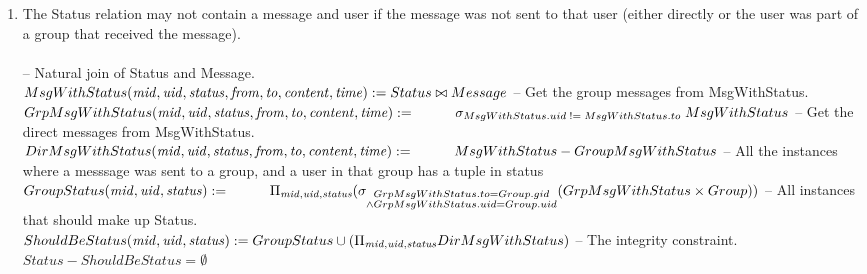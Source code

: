 \documentclass{article}
\newcommand{\var}[1]{\mathit{#1}}
\begin{document}
\begin{enumerate}
 
\item
The Status relation may not contain a message and user if the message was not sent to that user (either directly or the user was part of a group that received the message). \\\\ [5pt]
{\large
\hspace*{1cm} -- Natural join of Status and Message.\\ [5pt]
$
MsgWithStatus(\var{mid}, \var{uid}, \var{status}, \var{from}, \var{to}, \var{content}, \var{time}) := 
	Status \bowtie Message \\\\ [5pt]
$ 
\hspace*{1cm} -- Get the group messages from MsgWithStatus. \\ [5pt]
$
GrpMsgWithStatus(\var{mid}, \var{uid}, \var{status}, \var{from}, \var{to}, \var{content}, \var{time}) := \\ [5pt]
\hspace*{1cm}
	\sigma_{MsgWithStatus.uid \; != \; MsgWithStatus.to} \; MsgWithStatus \\\\ [5pt]
$
\hspace*{1cm} -- Get the direct messages from MsgWithStatus. \\ [5pt]
$
DirMsgWithStatus(\var{mid}, \var{uid}, \var{status}, \var{from}, \var{to}, \var{content}, \var{time}) := \\ [5pt]
\hspace*{1cm}
	MsgWithStatus - GroupMsgWithStatus \\\\ [5pt]
$
\hspace*{1cm} -- All the instances where a messsage was sent to a group, and a user in that \hspace*{1cm}group has a tuple in status \\ [5pt]
$
GroupStatus(\var{mid}, \var{uid}, \var{status}) := \\ [5pt]
	\hspace*{1cm}\Pi_{\var{mid}, \var{uid}, \var{status}}
	(\sigma_{\substack{GrpMsgWithStatus.to = Group.gid \\
			\wedge GrpMsgWithStatus.uid = Group.uid}}
			(GrpMsgWithStatus \times Group)) \\\\\\ [5pt]
$
\hspace*{1cm} -- All instances that should make up Status. \\ [5pt]
$
ShouldBeStatus(\var{mid}, \var{uid}, \var{status}) :=
	GroupStatus \cup
	(\Pi_{\var{mid}, \var{uid}, \var{status}} DirMsgWithStatus) \\\\ [5pt]
$
\hspace*{1cm} -- The integrity constraint. \\ [5pt]
$
Status - ShouldBeStatus = \emptyset
$
}
\end{enumerate}
\end{document}
